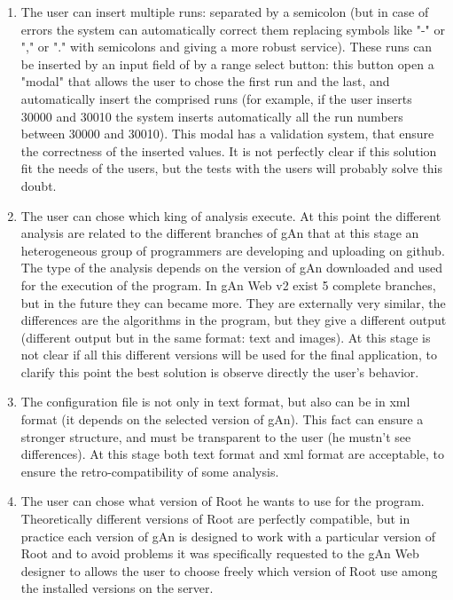 \begin{enumerate}
\begin{enumerate}

\item The user can insert multiple runs: separated by a semicolon (but in case of errors the system can automatically correct them replacing symbols like "-" or "," or "." with semicolons and giving a more robust service). These runs can be inserted by an input field of by a range select button: this button open a "modal" that allows the user to chose the first run and the last, and automatically insert the comprised runs (for example, if the user inserts 30000 and 30010 the system inserts automatically all the run numbers between 30000 and 30010). This modal has a validation system, that ensure the correctness of the inserted values. It is not perfectly clear if this solution fit the needs of the users, but the tests with the users will probably solve this doubt. 

\item The user can chose which king of analysis execute. At this point the different analysis are related to the different branches of gAn that at this stage an heterogeneous group of programmers are developing and uploading on github. The type of the analysis depends on the version of gAn downloaded and used for the execution of the program. In gAn Web v2 exist 5 complete branches, but in the future they can became more. They are externally very similar, the differences are the algorithms in the program, but they give a different output (different output but in the same format: text and images). 
At this stage is not clear if all this different versions will be used for the final application, to clarify this point the best solution is observe directly the user's behavior. 

\item The configuration file is not only in text format, but also can be in xml format (it depends on the selected version of gAn). This fact can ensure a stronger structure, and must be transparent to the user (he mustn't see differences). At this stage both text format and xml format are acceptable, to ensure the retro-compatibility of some analysis.

\item The user can chose what version of Root he wants to use for the program. Theoretically different versions of Root are perfectly compatible, but in practice each version of gAn is designed to work with a particular version of Root and to avoid problems it was specifically requested to the gAn Web designer to allows the user to choose freely which version of Root use among the installed versions on the server.  


\end{enumerate}
\end{enumerate}
